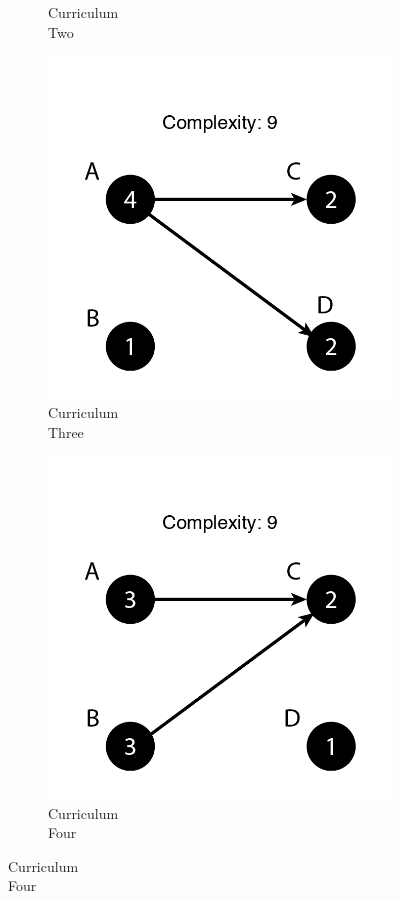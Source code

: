 \documentclass[botnum, fleqn]{unmeethesis}
\begin{document}
\begin{figure}
\begin{subfigure}[h!]{.20\linewidth}
        \caption{Curriculum \\ Two}\label{fig:simple7}
      \end{subfigure}
      \begin{subfigure}[h!]{.20\linewidth}
        \includegraphics[width=\linewidth]{./figures/Simple9-1.png}
        \caption{Curriculum \\ Three}\label{fig:simple91}
      \end{subfigure}
      \begin{subfigure}[h!]{.20\linewidth}
        \includegraphics[width=\linewidth]{./figures/Simple9-2.png}
        \caption{Curriculum \\ Four}\label{fig:simple92}
      \end{subfigure}


\end{figure}
\end{document}
